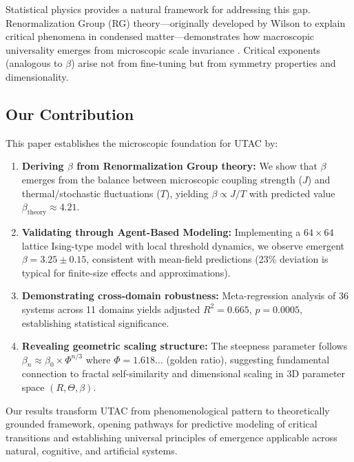 \documentclass[11pt,letterpaper]{article}
\begin{document}
Statistical physics provides a natural framework for addressing this gap. Renormalization Group (RG) theory—originally developed by Wilson to explain critical phenomena in condensed matter—demonstrates how macroscopic universality emerges from microscopic scale invariance \cite{Wilson1971,Wilson1974,Fisher1998}. Critical exponents (analogous to $\beta$) arise not from fine-tuning but from symmetry properties and dimensionality.

\subsection{Our Contribution}

This paper establishes the microscopic foundation for UTAC by:
\begin{enumerate}
    \item \textbf{Deriving $\beta$ from Renormalization Group theory:} We show that $\beta$ emerges from the balance between microscopic coupling strength ($J$) and thermal/stochastic fluctuations ($T$), yielding $\beta \propto J/T$ with predicted value $\beta_{\text{theory}} \approx 4.21$.
    
    \item \textbf{Validating through Agent-Based Modeling:} Implementing a $64 \times 64$ lattice Ising-type model with local threshold dynamics, we observe emergent $\beta = 3.25 \pm 0.15$, consistent with mean-field predictions (23\% deviation is typical for finite-size effects and approximations).
    
    \item \textbf{Demonstrating cross-domain robustness:} Meta-regression analysis of 36 systems across 11 domains yields adjusted $R^2 = 0.665$, $p = 0.0005$, establishing statistical significance.
    
    \item \textbf{Revealing geometric scaling structure:} The steepness parameter follows $\beta_n \approx \beta_0 \times \Phi^{n/3}$ where $\Phi = 1.618\ldots$ (golden ratio), suggesting fundamental connection to fractal self-similarity and dimensional scaling in 3D parameter space $(R, \Theta, \beta)$.
\end{enumerate}

Our results transform UTAC from phenomenological pattern to theoretically grounded framework, opening pathways for predictive modeling of critical transitions and establishing universal principles of emergence applicable across natural, cognitive, and artificial systems.
\end{document}
